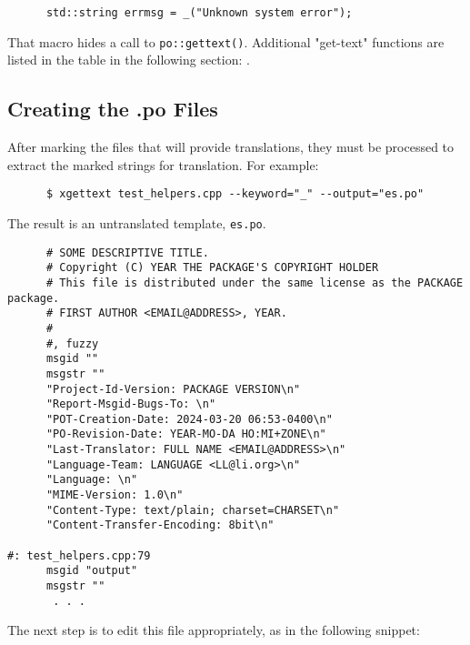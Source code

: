    \begin{verbatim}
      std::string errmsg = _("Unknown system error");
   \end{verbatim}

   That macro hides a call to \texttt{po::gettext()}.
   Additional "get-text" functions are listed in the table in the
   following section:
   .

\subsection{Creating the .po Files}
\label{subsubsec:potext_usage_creating_po_files}

   After marking the files that will provide translations, they must be
   processed to extract the marked strings for translation.
   For example:
   
   \begin{verbatim}
      $ xgettext test_helpers.cpp --keyword="_" --output="es.po"
   \end{verbatim}

   The result is an untranslated template, \texttt{es.po}.

   \begin{verbatim}
      # SOME DESCRIPTIVE TITLE.
      # Copyright (C) YEAR THE PACKAGE'S COPYRIGHT HOLDER
      # This file is distributed under the same license as the PACKAGE package.
      # FIRST AUTHOR <EMAIL@ADDRESS>, YEAR.
      #
      #, fuzzy
      msgid ""
      msgstr ""
      "Project-Id-Version: PACKAGE VERSION\n"
      "Report-Msgid-Bugs-To: \n"
      "POT-Creation-Date: 2024-03-20 06:53-0400\n"
      "PO-Revision-Date: YEAR-MO-DA HO:MI+ZONE\n"
      "Last-Translator: FULL NAME <EMAIL@ADDRESS>\n"
      "Language-Team: LANGUAGE <LL@li.org>\n"
      "Language: \n"
      "MIME-Version: 1.0\n"
      "Content-Type: text/plain; charset=CHARSET\n"
      "Content-Transfer-Encoding: 8bit\n"

#: test_helpers.cpp:79
      msgid "output"
      msgstr ""
       . . .
   \end{verbatim}

   The next step is to edit this file appropriately, as in the following
   snippet:


